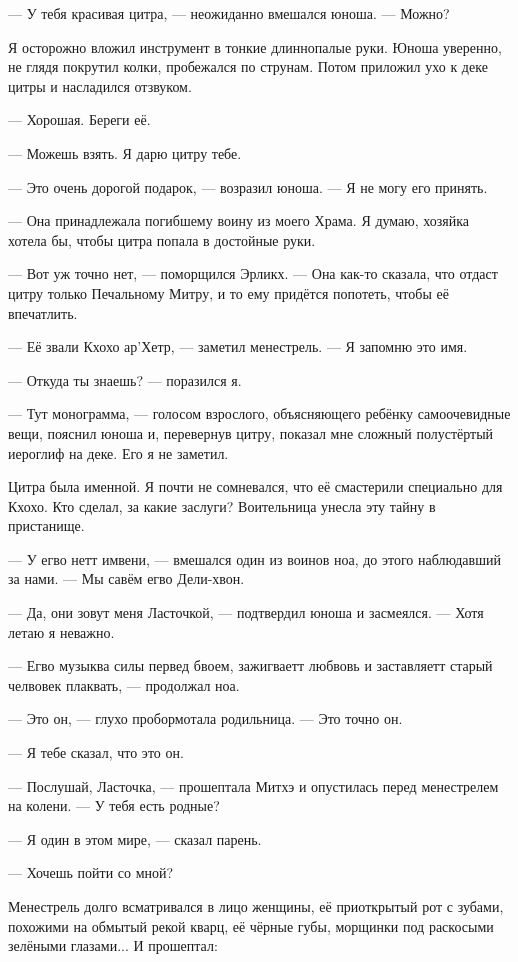 --- У тебя красивая цитра, --- неожиданно вмешался юноша.
--- Можно?

Я осторожно вложил инструмент в тонкие длиннопалые руки.
Юноша уверенно, не глядя покрутил колки, пробежался по струнам.
Потом приложил ухо к деке цитры и насладился отзвуком.

--- Хорошая.
Береги её.

--- Можешь взять.
Я дарю цитру тебе.

--- Это очень дорогой подарок, --- возразил юноша.
--- Я не могу его принять.

--- Она принадлежала погибшему воину из моего Храма.
Я думаю, хозяйка хотела бы, чтобы цитра попала в достойные руки.

--- Вот уж точно нет, --- поморщился Эрликх.
--- Она как-то сказала, что отдаст цитру только Печальному Митру, и то ему придётся попотеть, чтобы её впечатлить.

--- Её звали Кхохо ар’Хетр, --- заметил менестрель.
--- Я запомню это имя.

--- Откуда ты знаешь? --- поразился я.

--- Тут монограмма, --- голосом взрослого, объясняющего ребёнку самоочевидные вещи, пояснил юноша и, перевернув цитру, показал мне сложный полустёртый иероглиф на деке.
Его я не заметил.

Цитра была именной.
Я почти не сомневался, что её смастерили специально для Кхохо.
Кто сделал, за какие заслуги?
Воительница унесла эту тайну в пристанище.

--- У егво нетт имвени, --- вмешался один из воинов ноа, до этого наблюдавший за нами.
--- Мы савём егво Дели-хвон.

--- Да, они зовут меня Ласточкой, --- подтвердил юноша и засмеялся.
--- Хотя летаю я неважно.

--- Егво музыква силы первед бвоем, зажигваетт любвовь и заставляетт старый челвовек плаквать, --- продолжал ноа.

--- Это он, --- глухо пробормотала родильница.
--- Это точно он.

--- Я тебе сказал, что это он.

--- Послушай, Ласточка, --- прошептала Митхэ и опустилась перед менестрелем на колени.
--- У тебя есть родные?

--- Я один в этом мире, --- сказал парень.

--- Хочешь пойти со мной?

Менестрель долго всматривался в лицо женщины, её приоткрытый рот с зубами, похожими на обмытый рекой кварц, её чёрные губы, морщинки под раскосыми зелёными глазами...
И прошептал:


